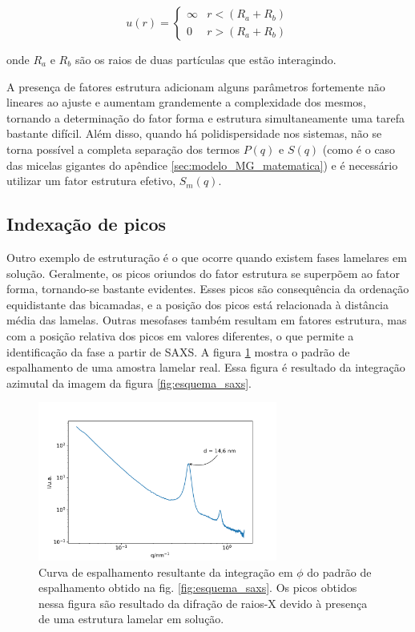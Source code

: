 		\begin{equation}
			u(r) = 
			\begin{cases}
				\infty  & r < (R_a + R_b) \\
				0		& r > (R_a + R_b)
			\end{cases}
			\label{eqn:potencial_esfera_rígida}
		\end{equation}

		\noindent onde \(R_a\) e \(R_b\) são os raios de duas partículas que estão interagindo.
		
		A presença de fatores estrutura adicionam alguns parâmetros fortemente não lineares ao ajuste e aumentam grandemente a complexidade dos mesmos, tornando a determinação do fator forma e estrutura simultaneamente uma tarefa bastante difícil. Além disso, quando há polidispersidade nos sistemas, não se torna possível a completa separação dos termos \(P(q)\) e \(S(q)\) (como é o caso das micelas gigantes do apêndice \ref{sec:modelo_MG_matematica}) e é necessário utilizar um fator estrutura efetivo, \(S_m(q)\).
		
		\subsection{Indexação de picos} 
		\label{sec:teoria_SAXS}
		
		Outro exemplo de estruturação é o que ocorre quando existem fases lamelares em solução. Geralmente, os picos oriundos do fator estrutura se superpõem ao fator forma, tornando-se bastante evidentes. Esses picos são consequência da ordenação equidistante das bicamadas, e a posição dos picos está relacionada à distância média das lamelas. Outras mesofases também resultam em fatores estrutura, mas com a posição relativa dos picos em valores diferentes, o que permite a identificação da fase a partir de SAXS. A figura \ref{fig:exemplo_saxs} mostra o padrão de espalhamento de uma amostra lamelar real. Essa figura é resultado da integração azimutal da imagem da figura \ref{fig:esquema_saxs}.
		
		\begin{figure}[h]
			\centering
			\includegraphics[width=0.7\textwidth]{imagens/saxs/exemplo_SAXS}
			\caption{Curva de espalhamento resultante da integração em \(\phi\) do padrão de espalhamento obtido na fig. \ref{fig:esquema_saxs}. Os picos obtidos nessa figura são resultado da difração de raios-X devido à presença de uma estrutura lamelar em solução.}
			\label{fig:exemplo_saxs}
		\end{figure}
		
